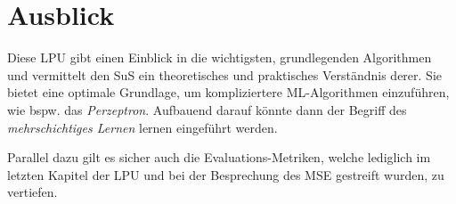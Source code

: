\documentclass[twocolumn]{article}
\begin{document}
\section{Ausblick}
\label{sec:abschluss}

Diese LPU gibt einen Einblick in die wichtigsten, grundlegenden Algorithmen und vermittelt den SuS ein theoretisches und praktisches Verständnis derer. Sie bietet eine optimale Grundlage, um kompliziertere ML-Algorithmen einzuführen, wie bspw. das \textit{Perzeptron}. Aufbauend darauf könnte dann der Begriff des \textit{mehrschichtiges Lernen} lernen eingeführt werden.

Parallel dazu gilt es sicher auch die Evaluations-Metriken, welche lediglich im letzten Kapitel der LPU und bei der Besprechung des MSE gestreift wurden, zu vertiefen. 
\end{document}
